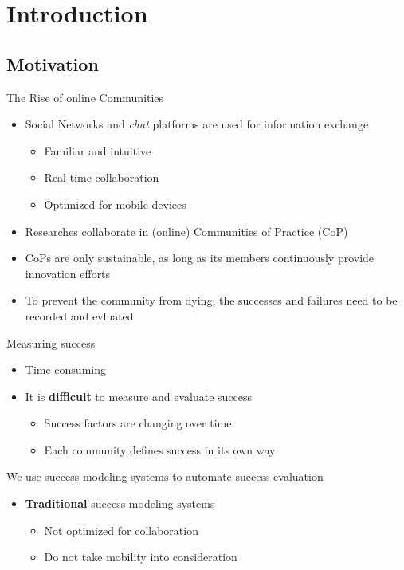 \section{Introduction}

\subsection{Motivation}


\begin{frame}{The Rise of online Communities}
  \begin{itemize}
    \item  Social Networks and \emph{chat} platforms are used for information exchange
    \begin{itemize}
      \item Familiar and intuitive
      \item Real-time collaboration
      \item Optimized for mobile devices
    \end{itemize}
    \item Researches collaborate in (online) Communities of Practice (CoP)
    \item CoPs are only sustainable, as long as its members continuously provide innovation efforts \cite{RKJa15}
    \item To prevent the community from dying, the successes and failures need to be recorded and evluated
  \end{itemize}

\end{frame}


\begin{frame}{Measuring success}
  \begin{itemize}
    \item Time consuming
    \item It is \textbf{difficult} to measure and evaluate success
          \begin{itemize}
            \item Success factors are changing over time \cite{Renz08}
            \item Each community defines success in its own way
          \end{itemize}
  \end{itemize}
 We use success modeling systems to automate success evaluation
    \begin{itemize}
        \item \textbf{Traditional} success modeling systems 
          \begin{itemize}
            \item Not optimized for collaboration
            \item Do not take mobility into consideration \cite{Renz08}
          \end{itemize}
  \end{itemize}
\end{frame}

